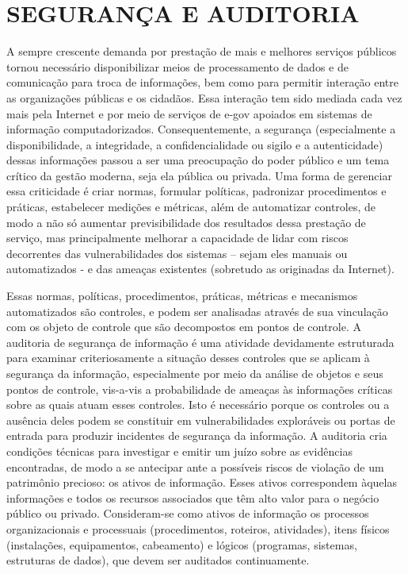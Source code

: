 
\chapter{SEGURANÇA E AUDITORIA}
\label{sec:tarefa3}

A sempre crescente demanda por prestação de mais e melhores serviços públicos tornou
necessário disponibilizar meios de processamento de dados e de comunicação para troca de
informações, bem como para permitir interação entre as organizações públicas e os cidadãos.
Essa interação tem sido mediada cada vez mais pela Internet e por meio de serviços de e-gov
apoiados em sistemas de informação computadorizados. Consequentemente, a segurança (especialmente a disponibilidade, a integridade, a confidencialidade ou sigilo e a autenticidade)
dessas informações passou a ser uma preocupação do poder público e um tema crítico da
gestão moderna, seja ela pública ou privada. Uma forma de gerenciar essa criticidade é criar
normas, formular políticas, padronizar procedimentos e práticas, estabelecer medições e métricas, além de automatizar controles, de modo a não só aumentar previsibilidade dos resultados dessa prestação de serviço, mas principalmente melhorar a capacidade de lidar com riscos
decorrentes das vulnerabilidades dos sistemas – sejam eles manuais ou automatizados - e das
ameaças existentes (sobretudo as originadas da Internet).

Essas normas, políticas, procedimentos, práticas, métricas e mecanismos automatizados
são controles, e podem ser analisadas através de sua vinculação com os objeto de controle
que são decompostos em pontos de controle. A auditoria de segurança de informação é uma
atividade devidamente estruturada para examinar criteriosamente a situação desses controles
que se aplicam à segurança da informação, especialmente por meio da análise de objetos e
seus pontos de controle, vis-a-vis a probabilidade de ameaças às informações críticas sobre as
quais atuam esses controles. Isto é necessário porque os controles ou a ausência deles podem
se constituir em vulnerabilidades exploráveis ou portas de entrada para produzir incidentes
de segurança da informação. A auditoria cria condições técnicas para investigar e emitir um
juízo sobre as evidências encontradas, de modo a se antecipar ante a possíveis riscos de violação de um patrimônio precioso: os ativos de informação. Esses ativos correspondem àquelas
informações e todos os recursos associados que têm alto valor para o negócio público ou privado. Consideram-se como ativos de informação os processos organizacionais e processuais
(procedimentos, roteiros, atividades), itens físicos (instalações, equipamentos, cabeamento) e
lógicos (programas, sistemas, estruturas de dados), que devem ser auditados continuamente.


